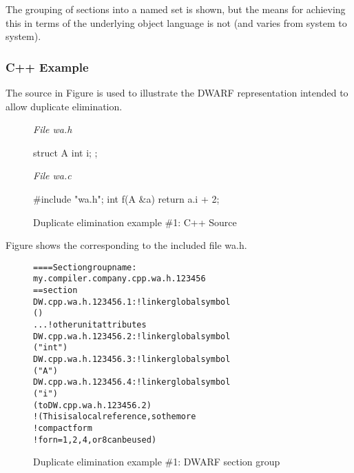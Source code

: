 The grouping of sections into a named set is shown, but the means for achieving this in terms of
the underlying object language is not (and varies from system to system).

\subsubsection{C++ Example}

The  source 
in 
Figure 
is used to illustrate the DWARF
representation intended to allow duplicate elimination.

\begin{figure}[ht]
\textit{File wa.h}
\begin{nlnlisting}
struct A {
   int i;
};
\end{nlnlisting}
\textit{File wa.c}
\begin{nlnlisting}
#include "wa.h";
int
f(A &a)
{
    return a.i + 2;
}
\end{nlnlisting}
\caption{Duplicate elimination example \#1: C++ Source}
\label{fig:duplicateeliminationexample1csource}
\end{figure}

Figure 
shows the  corresponding to the included file 
wa.h.

\begin{figure}
\begin{dwflisting}
\begin{alltt}
==== Section group name:
    my.compiler.company.cpp.wa.h.123456
== section \dotdebuginfo{}
DW.cpp.wa.h.123456.1:     ! linker global symbol
    \DWTAGcompileunit
        \DWATlanguage(\DWLANGCplusplus)
        ...  ! other unit attributes
DW.cpp.wa.h.123456.2:     ! linker global symbol
    \DWTAGbasetype
        \DWATname("int")
DW.cpp.wa.h.123456.3:     ! linker global symbol
    \DWTAGstructuretype
        \DWATname("A")
DW.cpp.wa.h.123456.4:     ! linker global symbol
        \DWTAGmember
        \DWATname("i")
        \DWATtype(\DWFORMrefn to DW.cpp.wa.h.123456.2)
            ! (This is a local reference, so the more
            ! compact form \DWFORMrefn 
            ! for n = 1,2,4, or 8 can be used)
\end{alltt}
\end{dwflisting}
\vspace{2mm}
\caption{Duplicate elimination example \#1: DWARF section group} 
\label{fig:duplicateeliminationexample1dwarfsectiongroup}
\end{figure}

